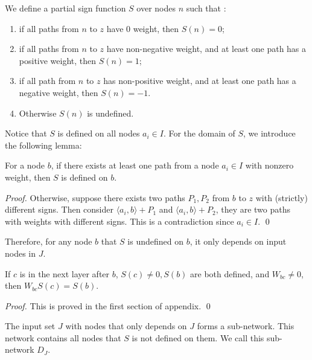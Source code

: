 			
			
			
			\begin{definition}\label{sign_of_nodes_in_I_2}
				We define a partial sign function $S$ over nodes $n$ such that : 	
				\begin{enumerate} 
					\item if all paths from $n$ to $z$ have 0 weight, then $S(n)=0$; 
					\item if all paths from $n$ to $z$ have non-negative weight, and at least one path has a positive weight, then $S(n)=1$; 
					\item if all path from $n$ to $z$ has non-positive weight, and at least one path has a negative weight, then $S(n)=-1$.
					\item Otherwise $S(n)$ is undefined.
				\end{enumerate}
			\end{definition}	
			
			Notice that $S$ is defined on all nodes $a_i \in I$. For the domain of $S$, we introduce the following lemma:
			
			\begin{lemma}\label{lem:sign}
				For a node $b$, if there exists at least one path from a node $a_i\in I$ with nonzero weight, then  $S$ is defined on $b$.
			\end{lemma}
			
			\begin{proof}
				Otherwise, suppose there exists two paths $P_1,P_2$ from $b$ to $z$ with (strictly) different signs. Then consider $\langle a_i,b\rangle+P_1$ and $\langle a_i,b\rangle+P_2$, they are two paths with weights with different signs. This is a contradiction since $a_i\in I$. \qed
			\end{proof}
			Therefore, for any node $b$  that $S$ is undefined on $b$, it only depends on input nodes in $J$.  
			
			\begin{lemma}
				If $c$ is in the next layer after $b$, $S(c)\neq 0, S(b)$ are both defined, and $W_{bc}\neq 0$, then $W_{bc}S(c)=S(b)$.
			\end{lemma}
			
			\begin{proof}
				This is proved in the first section of appendix. \qed
			\end{proof}
			
			\begin{lemma}\label{lem:subnetwork2}
				The input set $J$ with nodes that only depends on $J$ forms a sub-network. This network contains all nodes that $S$ is not defined on them. We call this sub-network $D_J$.
			\end{lemma}
			
